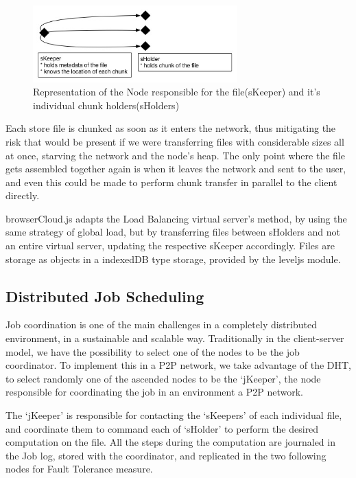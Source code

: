 \begin{figure}[h!]
  \centering
  \includegraphics[width=0.7\textwidth]{img/skeepersholder.jpg}
  \caption{Representation of the Node responsible for the file(sKeeper) and it's individual chunk holders(sHolders)}
  \label{fig:skeepersholder}
\end{figure}

Each store file is chunked as soon as it enters the network, thus mitigating the risk that would be present if we were transferring files with considerable sizes all at once, starving the network and the node's heap. The only point where the file gets assembled together again is when it leaves the network and sent to the user, and even this could be made to perform chunk transfer in parallel to the client directly.

browserCloud.js adapts the Load Balancing virtual server's method, by using the same strategy of global load, but by transferring files between sHolders and not an entire virtual server, updating the respective sKeeper accordingly. Files are storage as objects in a indexedDB type storage, provided by the leveljs module. 

\subsection{Distributed Job Scheduling}

Job coordination is one of the main challenges in a completely distributed environment, in a sustainable and scalable way. Traditionally in the client-server model, we have the possibility to select one of the nodes to be the job coordinator. To implement this in a P2P network, we take advantage of the DHT, to select randomly one of the ascended nodes to be the `jKeeper', the node responsible for coordinating the job in an environment a P2P network.

The `jKeeper' is responsible for contacting the `sKeepers' of each individual file, and coordinate them to command each of `sHolder' to perform the desired computation on the file. All the steps during the computation are journaled in the Job log, stored with the coordinator, and replicated in the two following nodes for Fault Tolerance measure.

